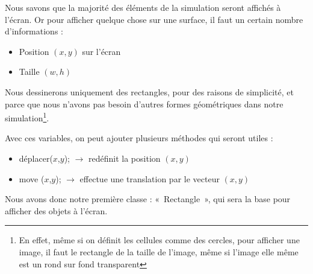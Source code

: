 Nous savons que la majorité des éléments de la simulation seront affichés à l'écran.
Or pour afficher quelque chose sur une surface, il faut un certain nombre d'informations : 
\begin{itemize}
  \item Position $(x,y)$ sur l'écran
  \item Taille $(w,h)$
\end{itemize}

Nous dessinerons uniquement des rectangles, pour des raisons de simplicité, et parce que nous n'avons pas besoin d'autres formes géométriques dans notre simulation\footnote{En effet, même si on définit les cellules comme des cercles, pour afficher une image, il faut le rectangle de la taille de l'image, même si l'image elle même est un rond sur fond transparent}.

Avec ces variables, on peut ajouter plusieurs méthodes qui seront utiles :
\begin{itemize}
  \item déplacer($x$,$y$); $\rightarrow$ redéfinit la position $(x,y)$
  \item move ($x$,$y$); $\rightarrow$ effectue une translation par le vecteur $(x,y)$
\end{itemize}


Nous avons donc notre première classe : «~Rectangle~», qui sera la base pour afficher des objets à l'écran.

